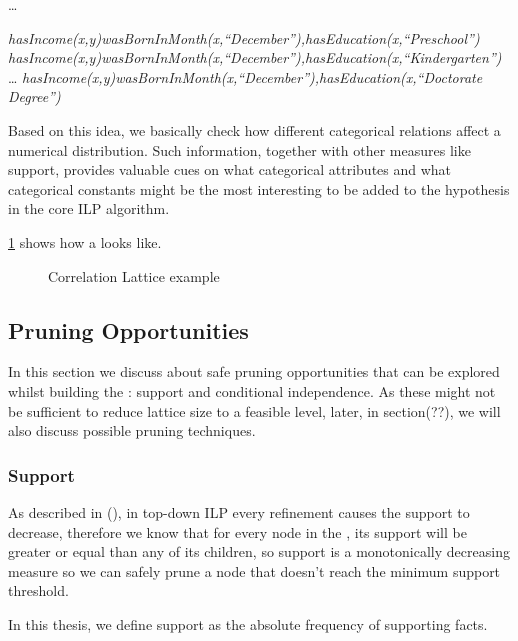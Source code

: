   \dots \newline

  \emph{hasIncome(x,y)wasBornInMonth(x,``December''),hasEducation(x,``Preschool'')} \newline
  \emph{hasIncome(x,y)wasBornInMonth(x,``December''),hasEducation(x,``Kindergarten'')} \newline
  \dots \newline
  \emph{hasIncome(x,y)wasBornInMonth(x,``December''),hasEducation(x,``Doctorate Degree'')} \newline


Based on this idea, we basically check how different categorical relations affect a numerical distribution. Such information, together with other measures like support, provides valuable cues on what categorical attributes and what categorical constants might be the most interesting to be added to the hypothesis in the core ILP algorithm.

\ref{fig:lattice} shows how a \graphname looks like.

\begin{figure}[!h]
  \caption{Correlation Lattice example}
  \centering
  
  \label{fig:lattice}
\end{figure}

\subsection{Pruning Opportunities}

In this section we discuss about safe pruning opportunities that can be explored whilst building the \graphname: support
and conditional independence. As these might not be sufficient to reduce lattice size to a feasible level, later, in
section(??), we will also discuss possible pruning techniques.

\subsubsection{Support}

As described in (\cite{LavracDz94}), in top-down ILP every refinement causes the support to decrease, therefore we know
that for every node in the \graphname, its support will be greater or equal than any of its children, so support is a
monotonically decreasing measure so we can safely prune a node that doesn't reach the minimum support threshold.

In this thesis, we define support as the absolute frequency of supporting facts.


